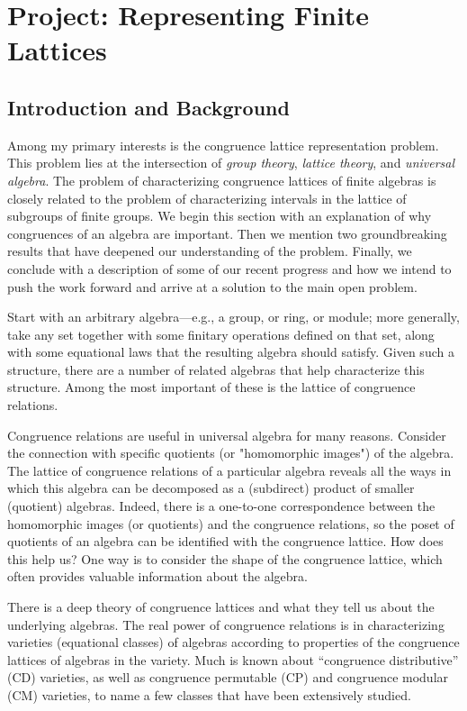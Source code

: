 \section{Project: Representing Finite Lattices}

\subsection{Introduction and Background}
Among my primary interests is the congruence lattice representation problem.
This problem lies at the intersection of \emph{group theory},
\emph{lattice theory}, and \emph{universal algebra}.
The problem of characterizing congruence lattices of finite algebras
is closely related to the problem of characterizing intervals in
the lattice of subgroups of finite groups.
We begin this section with an explanation of why congruences of an algebra
are important. Then we mention two groundbreaking results that have
deepened our understanding of the problem. Finally, 
we conclude with a description of some of our recent progress and
how we intend to push the work forward and arrive at a solution to
the main open problem.

Start with an arbitrary algebra---e.g., a group, or ring, or module;
more generally, take any set together with some finitary 
operations defined on that set, along with some equational laws that the
resulting algebra should satisfy.  Given such a structure, there
are a number of related algebras that help characterize this structure.
Among the most important of these is the lattice of congruence relations.

Congruence relations are useful in universal algebra for many reasons. Consider
the connection with specific quotients (or "homomorphic images") of
the algebra. The lattice of congruence relations of a particular algebra reveals
all the ways in which this algebra can be decomposed as a (subdirect) product of
smaller (quotient) algebras.  
Indeed, there is a one-to-one correspondence between the homomorphic images (or
quotients) and the congruence relations, so the poset of quotients of an algebra
can be identified with the congruence lattice. How does this help us?
One way is to consider the shape of the congruence lattice, which
often provides valuable information about the algebra. 

There is a deep theory of congruence lattices and what they tell us about the
underlying algebras.  The real power of congruence relations is in
characterizing varieties (equational classes) of algebras according to
properties of the congruence lattices of algebras in the variety. Much is known
about ``congruence distributive'' (CD) varieties, as well as congruence permutable
(CP) and congruence modular (CM) varieties, to name a few classes
that have been extensively studied. 

